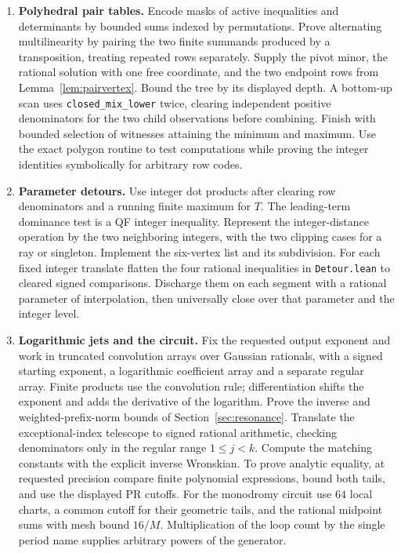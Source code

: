 \begin{enumerate}[leftmargin=*,itemsep=4pt]
\item \textbf{Polyhedral pair tables.} Encode masks of active inequalities and determinants by bounded sums indexed by permutations. Prove alternating multilinearity by pairing the two finite summands produced by a transposition, treating repeated rows separately. Supply the pivot minor, the rational solution with one free coordinate, and the two endpoint rows from Lemma~\ref{lem:pairvertex}. Bound the tree by its displayed depth. A bottom-up scan uses \texttt{closed\_mix\_lower} twice, clearing independent positive denominators for the two child observations before combining. Finish with bounded selection of witnesses attaining the minimum and maximum. Use the exact polygon routine to test computations while proving the integer identities symbolically for arbitrary row codes.
\item \textbf{Parameter detours.} Use integer dot products after clearing row denominators and a running finite maximum for $T$. The leading-term dominance test is a QF integer inequality. Represent the integer-distance operation by the two neighboring integers, with the two clipping cases for a ray or singleton. Implement the six-vertex list and its subdivision. For each fixed integer translate flatten the four rational inequalities in \texttt{Detour.lean} to cleared signed comparisons. Discharge them on each segment with a rational parameter of interpolation, then universally close over that parameter and the integer level.
\item \textbf{Logarithmic jets and the circuit.} Fix the requested output exponent and work in truncated convolution arrays over Gaussian rationals, with a signed starting exponent, a logarithmic coefficient array and a separate regular array. Finite products use the convolution rule; differentiation shifts the exponent and adds the derivative of the logarithm. Prove the inverse and weighted-prefix-norm bounds of Section~\ref{sec:resonance}. Translate the exceptional-index telescope to signed rational arithmetic, checking denominators only in the regular range $1\le j<k$. Compute the matching constants with the explicit inverse Wronskian. To prove analytic equality, at requested precision compare finite polynomial expressions, bound both tails, and use the displayed PR cutoffs. For the monodromy circuit use $64$ local charts, a common cutoff for their geometric tails, and the rational midpoint sums with mesh bound $16/M$. Multiplication of the loop count by the single period name supplies arbitrary powers of the generator.
\end{enumerate}

